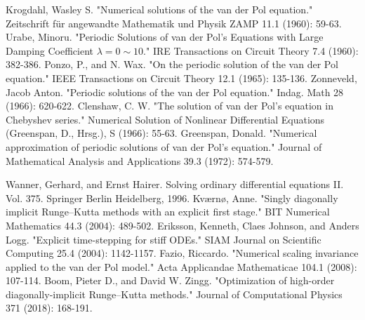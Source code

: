 \documentclass[final]{article}
\begin{document}
\begin{thebibliography}{}
 Krogdahl, Wasley S. "Numerical solutions of the van der Pol equation." Zeitschrift für angewandte Mathematik und Physik ZAMP 11.1 (1960): 59-63.
 Urabe, Minoru. "Periodic Solutions of van der Pol's Equations with Large Damping Coefficient $\lambda= 0 \sim 10$." IRE Transactions on Circuit Theory 7.4 (1960): 382-386.
 Ponzo, P., and N. Wax. "On the periodic solution of the van der Pol equation." IEEE Transactions on Circuit Theory 12.1 (1965): 135-136.
 Zonneveld, Jacob Anton. "Periodic solutions of the van der Pol equation." Indag. Math 28 (1966): 620-622.
 Clenshaw, C. W. "The solution of van der Pol's equation in Chebyshev series." Numerical Solution of Nonlinear Differential Equations (Greenspan, D., Hrsg.), S (1966): 55-63.
 Greenspan, Donald. "Numerical approximation of periodic solutions of van der Pol's equation." Journal of Mathematical Analysis and Applications 39.3 (1972): 574-579.
	

 Wanner, Gerhard, and Ernst Hairer. Solving ordinary differential equations II. Vol. 375. Springer Berlin Heidelberg, 1996.
 Kværnø, Anne. "Singly diagonally implicit Runge–Kutta methods with an explicit first stage." BIT Numerical Mathematics 44.3 (2004): 489-502.
 Eriksson, Kenneth, Claes Johnson, and Anders Logg. "Explicit time-stepping for stiff ODEs." SIAM Journal on Scientific Computing 25.4 (2004): 1142-1157.
 Fazio, Riccardo. "Numerical scaling invariance applied to the van der Pol model." Acta Applicandae Mathematicae 104.1 (2008): 107-114.
 Boom, Pieter D., and David W. Zingg. "Optimization of high-order diagonally-implicit Runge–Kutta methods." Journal of Computational Physics 371 (2018): 168-191.


\end{thebibliography}
\end{document}
